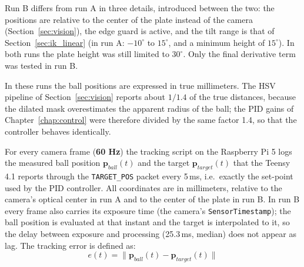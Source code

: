 \documentclass[12pt,a4paper]{report}
\begin{document}
Run B differs from run A in three details, introduced between the two: the positions are relative to the center of the plate instead of the camera (Section~\ref{sec:vision}), the edge guard is active, and the tilt range is that of Section~\ref{sec:ik_linear} (in run A: $-10^\circ$ to $15^\circ$, and a minimum height of $15^\circ$). In both runs the plate height was still limited to $30^\circ$. Only the final derivative term was tested in run B.

In these runs the ball positions are expressed in true millimeters. The HSV pipeline of Section~\ref{sec:vision} reports about $1/1.4$ of the true distances, because the dilated mask overestimates the apparent radius of the ball; the PID gains of Chapter~\ref{chap:control} were therefore divided by the same factor 1.4, so that the controller behaves identically.

For every camera frame (\textbf{60 Hz}) the tracking script on the Raspberry Pi 5 logs the measured ball position $\mathbf{p}_{ball}(t)$ and the target $\mathbf{p}_{target}(t)$ that the Teensy 4.1 reports through the \texttt{TARGET\_POS} packet every 5\,ms, i.e.\ exactly the set-point used by the PID controller. All coordinates are in millimeters, relative to the camera's optical center in run A and to the center of the plate in run B. In run B every frame also carries its exposure time (the camera's \texttt{SensorTimestamp}); the ball position is evaluated at that instant and the target is interpolated to it, so the delay between exposure and processing (25.3\,ms, median) does not appear as lag. The tracking error is defined as:
\begin{equation}
    e(t) = \lVert \mathbf{p}_{ball}(t) - \mathbf{p}_{target}(t) \rVert
\end{equation}
\end{document}
